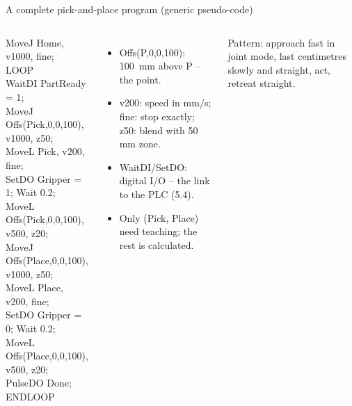 \documentclass[aspectratio=169,10pt]{beamer}
\renewcommand{\hl}[1]{\text{\color{mkOrange}\bfseries #1}}
\newcommand{\code}[1]{{\ttfamily\footnotesize #1}}
\begin{document}
\begin{frame}[t]{A complete pick-and-place program (generic pseudo-code)}
\begin{columns}[T,onlytextwidth]
\begin{tcolorbox}[colback=mkLight,colframe=mkGray,boxrule=.4pt,arc=1mm,left=2mm,top=1mm,bottom=1mm]
\ttfamily\footnotesize
MoveJ Home, v1000, fine;\\
LOOP\\
\hspace*{1.1em}WaitDI PartReady = 1;\\
\hspace*{1.1em}MoveJ Offs(Pick,0,0,100), v1000, z50;\\
\hspace*{1.1em}MoveL Pick, v200, fine;\\
\hspace*{1.1em}SetDO Gripper = 1; Wait 0.2;\\
\hspace*{1.1em}MoveL Offs(Pick,0,0,100), v500, z20;\\
\hspace*{1.1em}MoveJ Offs(Place,0,0,100), v1000, z50;\\
\hspace*{1.1em}MoveL Place, v200, fine;\\
\hspace*{1.1em}SetDO Gripper = 0; Wait 0.2;\\
\hspace*{1.1em}MoveL Offs(Place,0,0,100), v500, z20;\\
\hspace*{1.1em}PulseDO Done;\\
ENDLOOP
\end{tcolorbox}
\begin{itemize}\small
\item \code{Offs(P,0,0,100)}: \SI{100}{mm} above P -- the  point.
\item \code{v200}: speed in mm/s; \code{fine}: stop exactly; \code{z50}: blend with 50 mm zone.
\item \code{WaitDI}/\code{SetDO}: digital I/O -- the link to the PLC (5.4).
\item Only \hl{two points} (Pick, Place) need teaching; the rest is calculated.
\end{itemize}
\begin{notebox}
Pattern: approach fast in joint mode, last centimetres slowly and straight, act, retreat straight.
\end{notebox}
\end{columns}
\end{frame}
\end{document}
